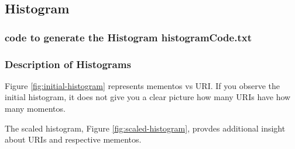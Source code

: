 \documentclass[12pt]{article}
\begin{document}
\subsection{Histogram }
\subsubsection{code to generate the Histogram histogramCode.txt}

\subsubsection{Description of Histograms}
Figure \ref{fig:initial-histogram} represents mementos vs URI. If you observe the initial histogram, it does not give you a clear picture how many URIs have how many momentos.

The scaled histogram, Figure \ref{fig:scaled-histogram}, provdes additional insight about URIs and respective mementos.
\end{document}
